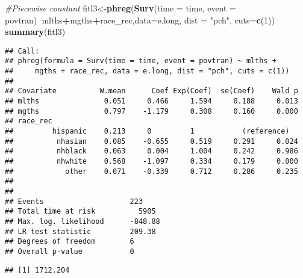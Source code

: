 \documentclass[
]{article}
\newenvironment{Shaded}{\begin{snugshade}}{\end{snugshade}}
\newcommand{\CommentTok}[1]{\textcolor[rgb]{0.56,0.35,0.01}{\textit{#1}}}
\newcommand{\DataTypeTok}[1]{\textcolor[rgb]{0.13,0.29,0.53}{#1}}
\newcommand{\DecValTok}[1]{\textcolor[rgb]{0.00,0.00,0.81}{#1}}
\newcommand{\KeywordTok}[1]{\textcolor[rgb]{0.13,0.29,0.53}{\textbf{#1}}}
\newcommand{\NormalTok}[1]{#1}
\newcommand{\OperatorTok}[1]{\textcolor[rgb]{0.81,0.36,0.00}{\textbf{#1}}}
\newcommand{\StringTok}[1]{\textcolor[rgb]{0.31,0.60,0.02}{#1}}
\begin{document}
\begin{Shaded}
\begin{Highlighting}[]
\CommentTok{#Piecewise constant}
\NormalTok{fitl3<-}\KeywordTok{phreg}\NormalTok{(}\KeywordTok{Surv}\NormalTok{(}\DataTypeTok{time =}\NormalTok{ time, }\DataTypeTok{event =}\NormalTok{ povtran)}\OperatorTok{~}\NormalTok{mlths}\OperatorTok{+}\NormalTok{mgths}\OperatorTok{+}\NormalTok{race_rec,}\DataTypeTok{data=}\NormalTok{e.long, }\DataTypeTok{dist =} \StringTok{"pch"}\NormalTok{, }\DataTypeTok{cuts=}\KeywordTok{c}\NormalTok{(}\DecValTok{1}\NormalTok{))}
\KeywordTok{summary}\NormalTok{(fitl3)  }
\end{Highlighting}
\end{Shaded}

\begin{verbatim}
## Call:
## phreg(formula = Surv(time = time, event = povtran) ~ mlths + 
##     mgths + race_rec, data = e.long, dist = "pch", cuts = c(1))
## 
## Covariate          W.mean      Coef Exp(Coef)  se(Coef)    Wald p
## mlths               0.051     0.466     1.594     0.188     0.013 
## mgths               0.797    -1.179     0.308     0.160     0.000 
## race_rec 
##         hispanic    0.213     0         1           (reference)
##          nhasian    0.085    -0.655     0.519     0.291     0.024 
##          nhblack    0.063     0.004     1.004     0.242     0.986 
##          nhwhite    0.568    -1.097     0.334     0.179     0.000 
##            other    0.071    -0.339     0.712     0.286     0.235 
## 
## 
## Events                    223 
## Total time at risk          5905 
## Max. log. likelihood      -848.88 
## LR test statistic         209.38 
## Degrees of freedom        6 
## Overall p-value           0
\end{verbatim}

\begin{Shaded}
\end{Shaded}

\begin{verbatim}
## [1] 1712.204
\end{verbatim}

\begin{Shaded}
\end{Shaded}
\end{document}
